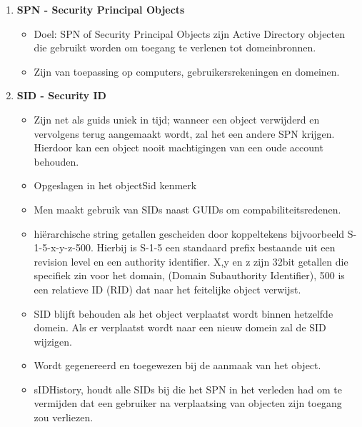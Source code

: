 \begin{enumerate}

\item \textbf{SPN - Security Principal Objects}
\begin{itemize}
\item Doel: SPN of Security Principal Objects zijn Active Directory objecten die gebruikt worden om toegang te verlenen tot domeinbronnen. 
\item Zijn van toepassing op computers, gebruikersrekeningen en domeinen.
\end{itemize}

\item \textbf{SID - Security ID}
\begin{itemize}
\item Zijn net als guids uniek in tijd; wanneer een object verwijderd en vervolgens terug aangemaakt wordt, zal het een andere SPN krijgen. Hierdoor kan een object nooit machtigingen van een oude account behouden.
\item Opgeslagen in het objectSid kenmerk
\item Men maakt gebruik van SIDs naast GUIDs om compabiliteitsredenen.
\item hi\"erarchische string getallen gescheiden door koppeltekens bijvoorbeeld S-1-5-x-y-z-500. Hierbij is S-1-5 een standaard prefix bestaande uit een revision level en een authority identifier. X,y en z zijn 32bit getallen die specifiek zin voor het domain, (Domain Subauthority Identifier), 500 is een relatieve ID (RID) dat naar het feitelijke object verwijst.
\item SID blijft behouden als het object verplaatst wordt binnen hetzelfde domein. Als er verplaatst wordt naar een nieuw domein zal de SID wijzigen.
\item Wordt gegenereerd en toegewezen bij de aanmaak van het object.
\item sIDHistory, houdt alle SIDs bij die het SPN in het verleden had om te vermijden dat een gebruiker na verplaatsing van objecten zijn toegang zou verliezen.
\end{itemize}


\end{enumerate}
